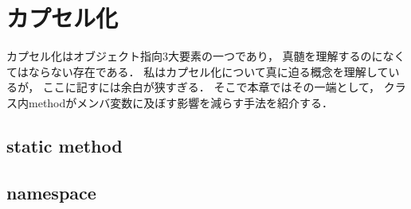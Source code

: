 \section{カプセル化}
カプセル化はオブジェクト指向3大要素の一つであり，
真髄を理解するのになくてはならない存在である．
私はカプセル化について真に迫る概念を理解しているが，
ここに記すには余白が狭すぎる．
そこで本章ではその一端として，
クラス内methodがメンバ変数に及ぼす影響を減らす手法を紹介する．


\subsection{static method}




\subsection{namespace}


